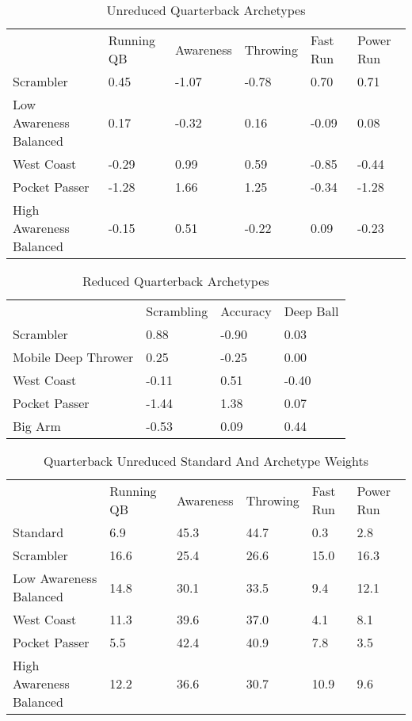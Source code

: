 \documentclass[11pt]{article}
\begin{document}
\begin{table}[]
\centering
\caption{Unreduced Quarterback Archetypes}
\label{UnreducedQuarterback}
\begin{tabular}{llllll}
                        & Running QB & Awareness & Throwing & Fast Run & Power Run \\
Scrambler               & 0.45       & -1.07     & -0.78    & 0.70     & 0.71      \\
Low Awareness Balanced  & 0.17       & -0.32     & 0.16     & -0.09    & 0.08      \\
West Coast              & -0.29      & 0.99      & 0.59     & -0.85    & -0.44     \\
Pocket Passer           & -1.28      & 1.66      & 1.25     & -0.34    & -1.28     \\
High Awareness Balanced & -0.15      & 0.51      & -0.22    & 0.09     & -0.23    
\end{tabular}
\end{table}

\begin{table}[]
\centering
\caption{Reduced Quarterback Archetypes}
\label{ReducedQuarterback}
\begin{tabular}{llll}
                    & Scrambling & Accuracy & Deep Ball \\
Scrambler           & 0.88       & -0.90    & 0.03      \\
Mobile Deep Thrower & 0.25       & -0.25    & 0.00      \\
West Coast          & -0.11      & 0.51     & -0.40     \\
Pocket Passer       & -1.44      & 1.38     & 0.07      \\
Big Arm             & -0.53      & 0.09     & 0.44     
\end{tabular}
\end{table}

\begin{table}[]
\centering
\caption{Quarterback Unreduced Standard And Archetype Weights}
\label{QuarterbackUnreducedWeights}
\begin{tabular}{llllll}
                        & Running QB & Awareness & Throwing & Fast Run & Power Run \\
Standard                & 6.9        & 45.3      & 44.7     & 0.3      & 2.8       \\
Scrambler               & 16.6       & 25.4      & 26.6     & 15.0     & 16.3      \\
Low Awareness Balanced  & 14.8       & 30.1      & 33.5     & 9.4      & 12.1      \\
West Coast              & 11.3       & 39.6      & 37.0     & 4.1      & 8.1       \\
Pocket Passer           & 5.5        & 42.4      & 40.9     & 7.8      & 3.5       \\
High Awareness Balanced & 12.2       & 36.6      & 30.7     & 10.9     & 9.6      
\end{tabular}
\end{table}
\end{document}
